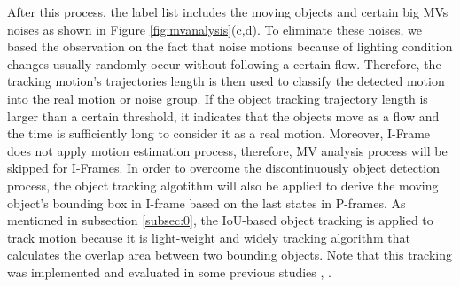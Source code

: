 After this process, the label list includes the moving objects and certain big MVs noises as shown in Figure \ref{fig:mvanalysis}(c,d). To eliminate these noises, we based the observation on the fact that noise motions because of lighting condition changes usually randomly occur without following a certain flow. Therefore, the tracking motion’s trajectories length is then used to classify the detected motion into the real motion or noise group. If the object tracking trajectory length is larger than a certain threshold, it indicates that the objects move as a flow and the time is sufficiently long to consider it as a real motion. Moreover, I-Frame does not apply motion estimation process, therefore, MV analysis process will be skipped for I-Frames. In order to overcome the discontinuously object detection process, the object tracking algotithm will also be applied to derive the moving object's bounding box in I-frame based on the last states in P-frames. As mentioned in subsection \ref{subsec:0}, the IoU-based object tracking is applied to track motion because it is light-weight and widely tracking algorithm that calculates the overlap area between two bounding objects. Note that this tracking was implemented and evaluated in some previous studies  \cite{sheu2019stam}, \cite{li2020hksiamfc}. 

